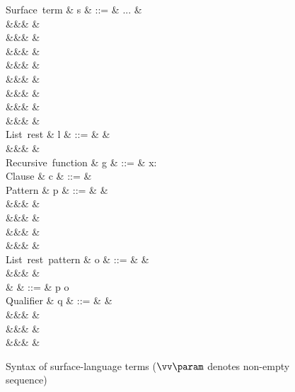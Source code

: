 \begin{figure}[H]
\begin{syntaxfig}
\mbox{Surface term}
&
s
&
::=
&
...
&
\\
&&&
&
\\
&&&
&
\\
&&&
&
\\
&&&
&
\\
&&&
&
\\
&&&
&
\\
&&&
&
\\
&&&
&
\\[2mm]

\mbox{List rest}
&
l
&
::=
&
\annListEnd{\alpha}
&
\\
&&&
&
\\[2mm]

\mbox{Recursive function}
&
g
&
::=
&
x: 
\\[2mm]

\mbox{Clause}
&
c
&
::=
&
\\[2mm]

\mbox{Pattern}
&
p
&
::=
&
&
\\
&&&
\pattNil
&
\\
&&&
&
\\
&&&
&
\\
&&&
&
\\[2mm]

\mbox{List rest pattern}
&
o
&
::=
&
\pattListEnd
&
\\
&&&
&
\\[2mm]

&
\pi
&
::=
&
p \mid o
\\[2mm]

\mbox{Qualifier}
&
q
&
::=
&
&
\\
&&&
&
\\
&&&
&
\\
&&&
\qualDone
&
\\[2mm]

\end{syntaxfig}
\caption{Syntax of surface-language terms ($\protect\vec{\param}$ denotes non-empty sequence)}
\end{figure}
